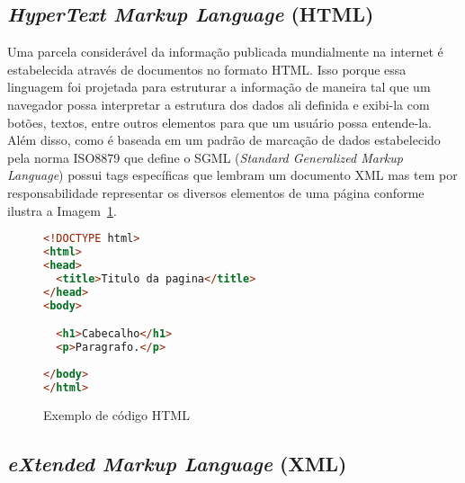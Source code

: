 \subsection{\emph{HyperText Markup Language} (HTML)}
\label{sec:html}

Uma parcela considerável da informação publicada mundialmente na internet é estabelecida através de documentos no formato HTML. Isso porque essa linguagem foi projetada para estruturar a informação de maneira tal que um navegador possa interpretar a estrutura dos dados ali definida e exibi-la com botões, textos, entre outros elementos para que um usuário possa entende-la. Além disso, como é baseada em um padrão de marcação de dados estabelecido pela norma ISO8879 que define o SGML (\emph{Standard Generalized Markup Language}) possui tags específicas que lembram um documento XML mas tem por responsabilidade representar os diversos elementos de uma página conforme ilustra a Imagem~\ref{fig:exemplo_codigo_html}.





\begin{figure}[!ht]
    \begin{lstlisting}[language=HTML,frame=trbl]
<!DOCTYPE html>
<html>
<head>
  <title>Titulo da pagina</title>
</head>
<body>

  <h1>Cabecalho</h1>
  <p>Paragrafo.</p>
  
</body>
</html>
    \end{lstlisting}
    \caption{Exemplo de código HTML}
    \label{fig:exemplo_codigo_html} 
\end{figure}

\subsection{\emph{eXtended Markup Language} (XML)}
\label{sec:xml}

